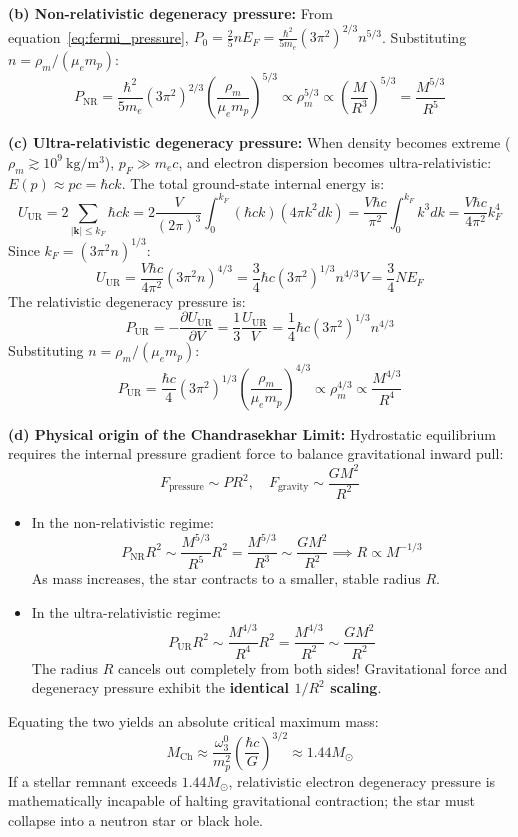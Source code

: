 \documentclass[11pt,a4paper]{article}
\newcommand{\vb}[1]{\mathbf{#1}}
\begin{document}
\textbf{(b) Non-relativistic degeneracy pressure:}
From equation~\eqref{eq:fermi_pressure}, $P_0 = \frac{2}{5}n E_F = \frac{\hbar^2}{5m_e}(3\pi^2)^{2/3} n^{5/3}$. Substituting $n = \rho_m / (\mu_e m_p)$:
\[
P_{\mathrm{NR}} = \frac{\hbar^2}{5m_e}(3\pi^2)^{2/3} \left( \frac{\rho_m}{\mu_e m_p} \right)^{5/3} \propto \rho_m^{5/3} \propto \left(\frac{M}{R^3}\right)^{5/3} = \frac{M^{5/3}}{R^5}
\]

\textbf{(c) Ultra-relativistic degeneracy pressure:}
When density becomes extreme ($\rho_m \gtrsim 10^9\ \mathrm{kg/m^3}$), $p_F \gg m_e c$, and electron dispersion becomes ultra-relativistic: $E(p) \approx p c = \hbar c k$.
The total ground-state internal energy is:
\[
U_{\mathrm{UR}} = 2 \sum_{|\vb{k}| \le k_F} \hbar c k = 2 \frac{V}{(2\pi)^3}\int_0^{k_F} (\hbar c k)(4\pi k^2 dk) = \frac{V \hbar c}{\pi^2}\int_0^{k_F} k^3 dk = \frac{V \hbar c}{4\pi^2}k_F^4
\]
Since $k_F = (3\pi^2 n)^{1/3}$:
\[
U_{\mathrm{UR}} = \frac{V \hbar c}{4\pi^2}(3\pi^2 n)^{4/3} = \frac{3}{4}\hbar c (3\pi^2)^{1/3} n^{4/3} V = \frac{3}{4} N E_F
\]
The relativistic degeneracy pressure is:
\[
P_{\mathrm{UR}} = -\frac{\partial U_{\mathrm{UR}}}{\partial V} = \frac{1}{3}\frac{U_{\mathrm{UR}}}{V} = \frac{1}{4}\hbar c (3\pi^2)^{1/3} n^{4/3}
\]
Substituting $n = \rho_m / (\mu_e m_p)$:
\[
\boxed{P_{\mathrm{UR}} = \frac{\hbar c}{4}(3\pi^2)^{1/3} \left( \frac{\rho_m}{\mu_e m_p} \right)^{4/3} \propto \rho_m^{4/3} \propto \frac{M^{4/3}}{R^4}}
\]

\textbf{(d) Physical origin of the Chandrasekhar Limit:}
Hydrostatic equilibrium requires the internal pressure gradient force to balance gravitational inward pull:
\[
F_{\mathrm{pressure}} \sim P R^2, \quad F_{\mathrm{gravity}} \sim \frac{G M^2}{R^2}
\]
\begin{itemize}
    \item In the non-relativistic regime:
    \[
    P_{\mathrm{NR}} R^2 \sim \frac{M^{5/3}}{R^5} R^2 = \frac{M^{5/3}}{R^3} \sim \frac{G M^2}{R^2} \implies R \propto M^{-1/3}
    \]
    As mass increases, the star contracts to a smaller, stable radius $R$.
    \item In the ultra-relativistic regime:
    \[
    P_{\mathrm{UR}} R^2 \sim \frac{M^{4/3}}{R^4} R^2 = \frac{M^{4/3}}{R^2} \sim \frac{G M^2}{R^2}
    \]
    The radius $R$ cancels out completely from both sides! Gravitational force and degeneracy pressure exhibit the \textbf{identical $1/R^2$ scaling}.
\end{itemize}
Equating the two yields an absolute critical maximum mass:
\[
M_{\mathrm{Ch}} \approx \frac{\omega_3^0}{m_p^2}\left(\frac{\hbar c}{G}\right)^{3/2} \approx 1.44 M_\odot
\]
If a stellar remnant exceeds $1.44 M_\odot$, relativistic electron degeneracy pressure is mathematically incapable of halting gravitational contraction; the star must collapse into a neutron star or black hole.
\end{document}
